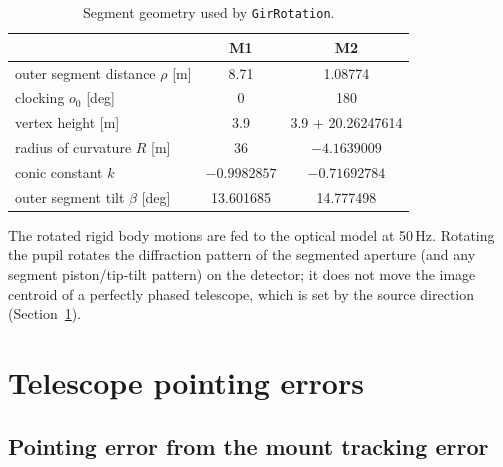\documentclass{gmto}
\numberwithin{table}{section}
\numberwithin{equation}{section}
\newcommand{\code}[1]{\texttt{#1}}
\begin{document}
\begin{table}[htbp]
  \centering
  \caption{Segment geometry used by \code{GirRotation}.}
  \label{tab:geometry}
  \begin{tabular}{lcc}
    \toprule
                                 & M1            & M2 \\
    \midrule
    outer segment distance $\rho$ [m] & 8.71     & 1.08774 \\
    clocking $o_0$ [deg]         & 0             & 180 \\
    vertex height [m]            & 3.9           & 3.9 + 20.26247614 \\
    radius of curvature $R$ [m]  & 36            & $-4.1639009$ \\
    conic constant $k$           & $-0.9982857$  & $-0.71692784$ \\
    outer segment tilt $\beta$ [deg] & 13.601685 & 14.777498 \\
    \bottomrule
  \end{tabular}
\end{table}

The rotated rigid body motions are fed to the optical model at 50\,Hz. Rotating the pupil rotates
the diffraction pattern of the segmented aperture (and any segment piston/tip-tilt pattern) on the
detector; it does not move the image centroid of a perfectly phased telescope, which is set by the
source direction (Section~\ref{sec:pointing}).

\section{Telescope pointing errors}
\label{sec:pointing}

\subsection{Pointing error from the mount tracking error}
\label{sec:pointing-error}
\end{document}
